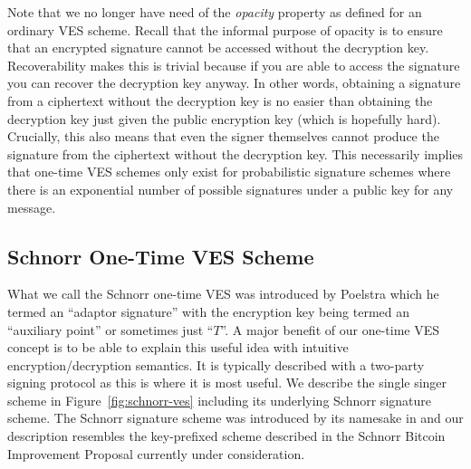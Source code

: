 \documentclass[fullpage]{article}
\theoremstyle{definition}
\begin{document}
Note that we no longer have need of the \emph{opacity} property as defined for an ordinary VES scheme. Recall that the informal purpose of opacity is to ensure that an encrypted signature cannot be accessed without the decryption key. Recoverability makes this is trivial because if you are able to access the signature you can recover the decryption key anyway. In other words, obtaining a signature from a ciphertext without the decryption key is no easier than obtaining the decryption key just given the public encryption key (which is hopefully hard). Crucially, this also means that even the signer themselves cannot produce the signature from the ciphertext without the decryption key. This necessarily implies that one-time VES schemes only exist for probabilistic signature schemes where there is an exponential number of possible signatures under a public key for any message.

\subsection{Schnorr One-Time VES Scheme}
What we call the Schnorr one-time VES was introduced by Poelstra \cite{poelstra2017scriptless} which he termed an ``adaptor signature''\cite{poelstra-adaptor} with the encryption key being termed an ``auxiliary point''\cite{blind-tumbler} or sometimes just ``$T$''. A major benefit of our one-time VES concept is to be able to explain this useful idea with intuitive encryption/decryption semantics. It is typically described with a two-party signing protocol as this is where it is most useful. We describe the single singer scheme in Figure~\ref{fig:schnorr-ves} including its underlying Schnorr signature scheme. The Schnorr signature scheme was introduced by its namesake in \cite{Schnorr:1989:EIS:646754.705037} and our description resembles the key-prefixed scheme described in the Schnorr Bitcoin Improvement Proposal\cite{bip-schnorr} currently under consideration.
\end{document}
